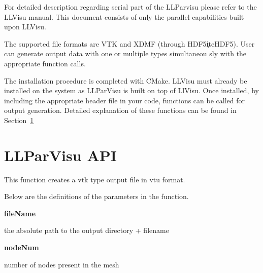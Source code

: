 \documentclass{article}
\begin{document}
For detailed description regarding serial part of the LLParvisu please refer to the LLVisu manual. This document consists of only the parallel capabilities built upon LLVisu.

The supported file formats are VTK\cite{VTK} and XDMF\cite{XDMF} (through HDF5\c
ite{HDF5}). User can generate output data with one or multiple types simultaneou
sly with the appropriate function calls.

The installation procedure is completed with CMake\cite{CMake}. LLVisu must already be installed on the system as LLParVisu is built on top of LlVisu. Once installed, by including the appropriate header file in your code, functions can be called for output generation. Detailed explanation of these functions can be found in Section~\ref{sec:API}


\newpage

\section{LLParVisu API}
\label{sec:API}

\bigskip

        \par This function creates a vtk type output file in vtu format.
\bigskip
        
        \par Below are the definitions of the parameters in the function.
\medskip

        {\bf fileName}  \par the absolute path to the output directory + filename
\medskip
        
        {\bf nodeNum} \par number of nodes present in the mesh
\medskip
        
\end{document}
